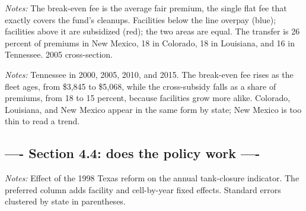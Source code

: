 \documentclass[
  12pt,
]{article}
\begin{document}
\clearpage
\null\vfill
\begin{center}
\label{fig-cross-area}
\par\vspace{8pt}
\par\vspace{8pt}
\begin{minipage}{0.85\textwidth}\small\textit{Notes:} The break-even fee is the average fair premium, the single flat fee that exactly covers the fund's cleanups. Facilities below the line overpay (blue); facilities above it are subsidized (red); the two areas are equal. The transfer is 26 percent of premiums in New Mexico, 18 in Colorado, 18 in Louisiana, and 16 in Tennessee. 2005 cross-section.\end{minipage}
\end{center}
\vfill\clearpage

\clearpage
\null\vfill
\begin{center}
\label{fig-cross-time}
\par\vspace{8pt}
\par\vspace{8pt}
\begin{minipage}{0.85\textwidth}\small\textit{Notes:} Tennessee in 2000, 2005, 2010, and 2015. The break-even fee rises as the fleet ages, from \$3,845 to \$5,068, while the cross-subsidy falls as a share of premiums, from 18 to 15 percent, because facilities grow more alike. Colorado, Louisiana, and New Mexico appear in the same form by state; New Mexico is too thin to read a trend.\end{minipage}
\end{center}
\vfill\clearpage

\subsection{---- Section 4.4: does the policy work
----}\label{section-4.4-does-the-policy-work--}

\clearpage
\null\vfill
\begin{center}
\label{tbl-stepped-did}
\vspace{6pt}
\par\vspace{10pt}
\begin{minipage}{0.85\textwidth}\small\textit{Notes:} Effect of the 1998 Texas reform on the annual tank-closure indicator. The preferred column adds facility and cell-by-year fixed effects. Standard errors clustered by state in parentheses.\end{minipage}
\end{center}
\vfill\clearpage
\end{document}
